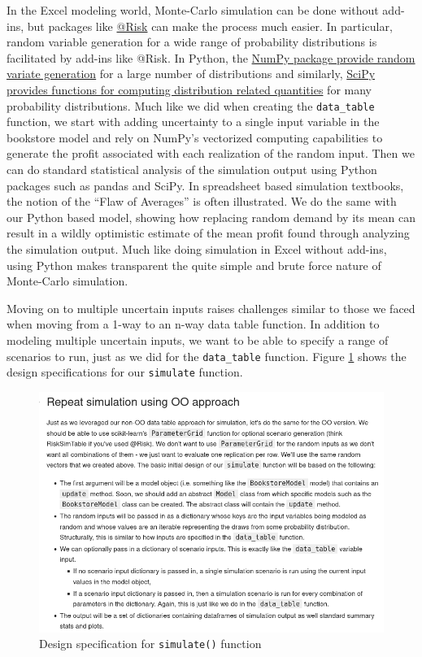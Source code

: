 \documentclass[ited,blindrev]{informs3}              %
\newcommand{\code}[1]{\texttt{#1}}
\begin{document}
In the Excel modeling world, Monte-Carlo simulation can be done without add-ins, but packages like \href{https://lumivero.com/products/at-risk/}{@Risk} can make the process much easier. In particular, random variable generation for a wide range of probability distributions is facilitated by add-ins like @Risk. In Python, the \href{https://numpy.org/doc/stable/reference/random/generator.html}{NumPy package provide random variate generation} for a large number of distributions and similarly, \href{https://docs.scipy.org/doc/scipy/reference/stats.html}{SciPy provides functions for computing distribution related quantities} for many probability distributions. Much like we did when creating the \code{data\_table} function, we start with adding uncertainty to a single input variable in the bookstore model and rely on NumPy's vectorized computing capabilities to generate the profit associated with each realization of the random input. Then we can do standard statistical analysis of the simulation output using Python packages such as pandas and SciPy. In spreadsheet based simulation textbooks, the notion of the ``Flaw of Averages'' \citep{savageFlawAveragesWhy2012} is often illustrated. We do the same with our Python based model, showing how replacing random demand by its mean can result in a wildly optimistic estimate of the mean profit found through analyzing the simulation output. Much like doing simulation in Excel without add-ins, using Python makes transparent the quite simple and brute force nature of Monte-Carlo simulation.

Moving on to multiple uncertain inputs raises challenges similar to those we faced when moving from a 1-way to an n-way data table function. In addition to modeling multiple uncertain inputs, we want to be able to specify a range of scenarios to run, just as we did for the \code{data\_table} function. Figure \ref{fig:oo_sim_design_specs} shows the design specifications for our \code{simulate} function.

\begin{figure}[!htbp]
\centering
\includegraphics[scale=0.5]{oo_sim_design_specs}
\caption{Design specification for \code{simulate()} function}
\label{fig:oo_sim_design_specs}
\end{figure}
\end{document}
